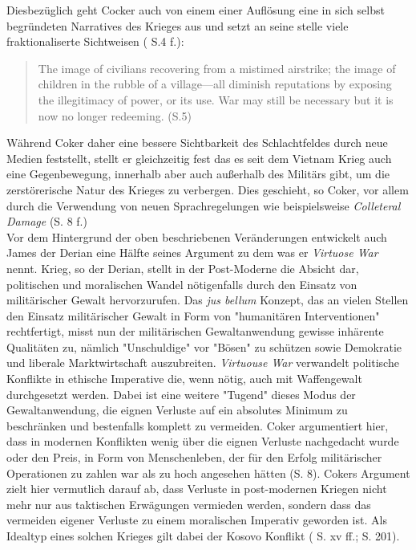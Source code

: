 \documentclass[11pt,a4paper,oneside,numbers=noenddot,bibliography=totocnumbered,DIV=13]{scrartcl}
\begin{document}
Diesbezüglich geht Cocker auch von einem einer Auflösung eine in sich selbst begründeten Narratives des Krieges aus und setzt an seine stelle viele fraktionaliserte Sichtweisen (\cite{coker_collision_2012} S.4 f.):
\begin{quote}
The image of civilians recovering from a mistimed airstrike; the image of children in the
rubble of a village—all diminish reputations by exposing the illegitimacy of power, or its use. War may still be
necessary but it is now no longer redeeming. (\cite{coker_collision_2012}S.5) 
\end{quote}  
Während Coker daher eine bessere Sichtbarkeit des Schlachtfeldes durch neue Medien feststellt, stellt er gleichzeitig fest das es seit dem Vietnam Krieg auch eine Gegenbewegung, innerhalb aber auch außerhalb des Militärs gibt, um die zerstörerische Natur des Krieges zu verbergen. Dies geschieht, so Coker, vor allem durch die Verwendung von neuen Sprachregelungen wie beispielsweise \textit{Colleteral Damage} (\cite{coker_postmodern_2008}S. 8 f.)\\  
Vor dem Hintergrund der oben beschriebenen Veränderungen entwickelt auch James der Derian eine Hälfte seines Argument zu dem was er \textit{Virtuose War} nennt. Krieg, so der Derian, stellt in der Post-Moderne die Absicht dar, politischen und moralischen Wandel nötigenfalls durch den Einsatz von militärischer Gewalt hervorzurufen. Das \textit{jus bellum} Konzept, das an vielen Stellen den Einsatz militärischer Gewalt in Form von "humanitären Interventionen" rechtfertigt, misst nun der militärischen Gewaltanwendung gewisse inhärente Qualitäten zu, nämlich "Unschuldige" vor "Bösen" zu schützen sowie Demokratie und liberale Marktwirtschaft auszubreiten. \textit{Virtuouse War} verwandelt politische Konflikte in ethische Imperative die, wenn nötig, auch mit Waffengewalt durchgesetzt werden. Dabei ist eine weitere "Tugend" dieses Modus der Gewaltanwendung, die eignen Verluste auf ein absolutes Minimum zu beschränken und bestenfalls komplett zu vermeiden. Coker argumentiert hier, dass in modernen Konflikten wenig über die eignen Verluste nachgedacht wurde oder den Preis, in Form von Menschenleben, der für den Erfolg militärischer Operationen zu zahlen war als zu hoch angesehen hätten (\cite{coker_postmodern_2008}S. 8). 
Cokers Argument zielt hier vermutlich darauf ab, dass Verluste in post-modernen Kriegen nicht mehr nur aus taktischen Erwägungen vermieden werden, sondern dass das vermeiden eigener Verluste zu einem moralischen Imperativ geworden ist. Als Idealtyp eines solchen Krieges gilt dabei der Kosovo Konflikt (\cite{DerDerian2001} S. xv ff.; S. 201).\\
\end{document}
